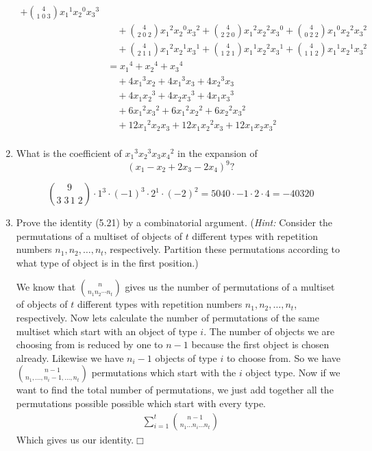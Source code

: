 \documentclass{article}
\begin{document}
\begin{enumerate}
\begin{align*}
  +\binom{4}{1\;0\;3}{x_1}^1{x_2}^0{x_3}^3\\
  &\quad+\binom{4}{2\;0\;2}{x_1}^2{x_2}^0{x_3}^2
  +\binom{4}{2\;2\;0}{x_1}^2{x_2}^2{x_3}^0
  +\binom{4}{0\;2\;2}{x_1}^0{x_2}^2{x_3}^2\\
  &\quad+\binom{4}{2\;1\;1}{x_1}^2{x_2}^1{x_3}^1
  +\binom{4}{1\;2\;1}{x_1}^1{x_2}^2{x_3}^1
  +\binom{4}{1\;1\;2}{x_1}^1{x_2}^1{x_3}^2\\
  &={x_1}^4+{x_2}^4+{x_3}^4\\
  &\quad+4{x_1}^3{x_2}+4{x_1}^3{x_3}+4{x_2}^3{x_3}\\
  &\quad+4{x_1}{x_2}^3+4{x_2}{x_3}^3+4{x_1}{x_3}^3\\
  &\quad+6{x_1}^2{x_3}^2+6{x_1}^2{x_2}^2+6{x_2}^2{x_3}^2\\
  &\quad+12{x_1}^2{x_2}{x_3}+12{x_1}{x_2}^2{x_3}+12{x_1}{x_2}{x_3}^2\\
\end{align*}
\setcounter{enumi}{39}\item
What is the coefficient of ${x_1}^3{x_2}^3x_3{x_4}^2$ in the expansion of
\[(x_1-x_2+2x_3-2x_4)^{9}?\]

\[\binom{9}{3\;3\,1\;2}\cdot1^3\cdot(-1)^3\cdot2^1\cdot(-2)^2=5040\cdot -1\cdot2\cdot4=-40320\]

\setcounter{enumi}{41}\item
Prove the identity (5.21) by a combinatorial argument. (\emph{Hint:} Consider the permutations of a multiset of objects of $t$ different types with repetition numbers $n_1,n_2,\dots,n_t$, respectively. Partition these permutations according to what type of object is in the first position.)

We know that $\binom{n}{n_1n_2\cdots n_t}$ gives us the number of permutations of a multiset of objects of $t$ different types with repetition numbers $n_1,n_2,\dots,n_t$, respectively. Now lets calculate the number of permutations of the same multiset which start with an object of type $i$. The number of objects we are choosing from is reduced by one to $n-1$ because the first object is chosen already. Likewise we have $n_i-1$ objects of type $i$ to choose from. So we have $\binom{n-1}{n_1,\dots,n_i-1,\dots,n_t}$ permutations which start with the $i$ object type. Now if we want to find the total number of permutations, we just add together all the permutations possible possible which start with every type.
\begin{align*}
  \sum\limits_{i=1}^t{\binom{n-1}{n_1\dots n_i\dots n_t}}
\end{align*}
Which gives us our identity.$\Box$
\end{enumerate}
\end{document}
